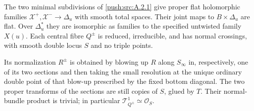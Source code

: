 \begin{theorem}\hypertarget{tag-02ZK}{}\label{push:src:A.2.2}\label{push:A22}

The two minimal subdivisions of \ref{push:src:A.2.1} give proper flat holomorphic
families $\mathcal X^+,\mathcal X^-\to\Delta_u$ with smooth total
spaces. Their joint maps to $B\times\Delta_u$ are flat. Over
$\Delta_u^*$ they are isomorphic as families to the specified
untwisted family $X(u)$. Each central fibre $Q^\pm$ is reduced,
irreducible, and has normal crossings, with smooth double locus
$S$ and no triple points.

Its normalization $R^\pm$ is obtained by blowing up $R$ along
$S_\infty$ in, respectively, one of its two sections and then
taking the small resolution at the unique ordinary double point
of that blow-up prescribed by the fixed bottom diagonal.
The two proper transforms of the sections are still copies of
$S$, glued by $T$. Their normal-bundle product is trivial;
in particular $\mathcal T^1_{Q^\pm}\simeq\mathcal O_S$.
\end{theorem}


